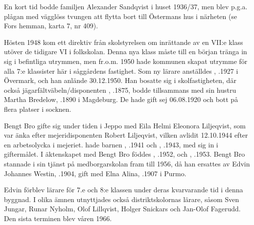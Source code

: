 En kort tid bodde familjen Alexander Sandqvist i huset 1936/37, men blev p.g.a. plågan med vägglöss tvungen att flytta bort till Östermans hus i närheten (se Fors hemman, karta 7, nr 409).


Hösten 1948 kom ett direktiv från skolstyrelsen om inrättande av en VII:e klass utöver de tidigare VI i folkskolan. Denna nya klass måste till en början tränga in sig i befintliga utrymmen, men fr.o.m. 1950 hade kommunen skapat utrymme för alla 7:e klassister här i såggårdens fastighet. Som ny lärare anställdes , .1927 i Övermark, och han anlände 30.12.1950. Han bosatte sig i skolfastigheten, där också jägarfältväbeln/disponenten , .1875, bodde tillsammans med sin hustru Martha Bredelow, .1890 i Magdeburg. De hade gift sej 06.08.1920 och bott på flera platser i socknen.

Bengt Bro gifte sig under tiden i Jeppo med Eila Helmi Eleonora Liljeqvist, som var änka efter mejeridisponenten Robert Liljeqvist, vilken avlidit 12.10.1944 efter en arbetsolycka i mejeriet.  hade barnen , .1941 och , .1943, med sig in i giftermålet. I äktenskapet med Bengt Bro föddes , .1952, och , .1953. Bengt Bro stannade i sin tjänst på medborgarskolan fram till 1956, då han ersattes av Edvin Johannes Westin, .1904, gift med Elna Alina, .1907 i Purmo.
\begin{jhchildren}
  \item {}
  \item {}
  \item {}
\end{jhchildren}

Edvin förblev lärare för 7.e och  8:e klassen under deras kvarvarande tid i denna byggnad. I olika ämnen utnyttjades också distriktskolornas lärare, såsom Sven Jungar, Runar Nyholm, Olof Lillqvist, Holger Snickars och Jan-Olof Fagerudd. Den sista terminen blev våren 1966.

